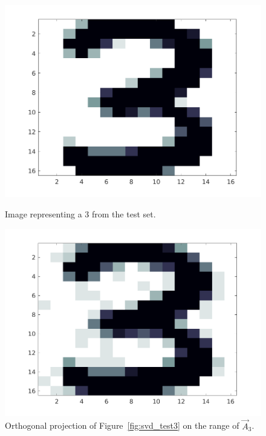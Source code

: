 \begin{figure}[H]
    \centering
    \begin{minipage}{0.45\textwidth}
        \includegraphics[width = \textwidth]{images/svd/test3.png}
        \caption{Image representing a 3 from the test set.}\label{fig:svd_test3}
    \end{minipage}
    \hspace{1em}
    \begin{minipage}{0.45\textwidth}
        \includegraphics[width = \textwidth]{images/svd/test3_proj.png}
        \caption{Orthogonal projection of Figure~\ref{fig:svd_test3} on the range of \(\vec{A}_3\).}\label{fig:svd_test3_proj}
    \end{minipage}
\end{figure}

